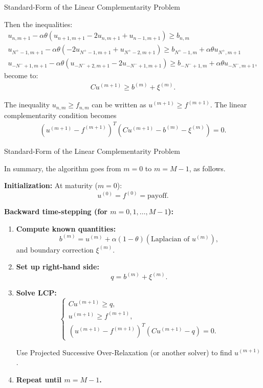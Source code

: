 \documentclass{beamer}
\begin{document}
\begin{frame}{Standard-Form of the Linear Complementarity Problem}

    {\footnotesize \footnotesize
    Then the inequalities:
    \begin{gather*}
        u_{n,m+1} - \alpha \theta (u_{n+1,m+1} - 2u_{n,m+1} + u_{n-1,m+1}) \geq b_{n,m}\\
        u_{N^{+}-1,m+1} - \alpha \theta (-2u_{N^{+}-1,m+1} + u_{N^{+}-2,m+1}) 
        \geq b_{N^{+}-1,m} + \alpha \theta u_{N^{+},m+1}\\
        u_{-N^{-}+1,m+1} - \alpha \theta (u_{-N^{-}+2,m+1} -
         2u_{-N^{-}+1,m+1}) \geq b_{-N^{-}+1,m} + \alpha \theta u_{-N^{-},m+1},
    \end{gather*}
    become to:
    \begin{align*}
        Cu^{(m+1)} \geq b^{(m)} + \xi^{(m)}.
    \end{align*}
    \par The inequality $u_{n,m} \geq f_{n,m}$ can be written as $u^{(m+1)} \geq f^{(m+1)}$. 
    The linear complementarity condition becomes
    \begin{align*}
        \left(u^{(m+1)} - f^{(m+1)}\right)^T \left(Cu^{(m+1)} - b^{(m)} - \xi^{(m)}\right) = 0.
    \end{align*}
    }
    
    
\end{frame}
\begin{frame}{Standard-Form of the Linear Complementarity Problem}

    {\footnotesize \footnotesize
     In summary, the algorithm goes from $m = 0$ to $m = M - 1$, as follows. 

    \textbf{Initialization:} At maturity ($m = 0$):
    \[
    u^{(0)} = f^{(0)} = \text{payoff}.
    \]

    \textbf{Backward time-stepping (for $m = 0, 1, \ldots, M - 1$):}
    \begin{enumerate}
    \item \textbf{Compute known quantities:}
    \[
    b^{(m)} = u^{(m)} + \alpha(1 - \theta)(\text{Laplacian of } u^{(m)}),
    \]
    and boundary correction $\xi^{(m)}$.

    \item \textbf{Set up right-hand side:}
    \[
    q = b^{(m)} + \xi^{(m)}.
    \]

    \item \textbf{Solve LCP:}
    \[
    \begin{cases}
    C u^{(m+1)} \geq q, \\
    u^{(m+1)} \geq f^{(m+1)}, \\
    (u^{(m+1)} - f^{(m+1)})^{T}(C u^{(m+1)} - q) = 0.
    \end{cases}
    \]
    \par  Use Projected Successive Over-Relaxation (or another solver) to find $u^{(m+1)}$.

    \item \textbf{Repeat until $m = M - 1$.}
    \end{enumerate}
    

    }
    
    
\end{frame}
\end{document}
